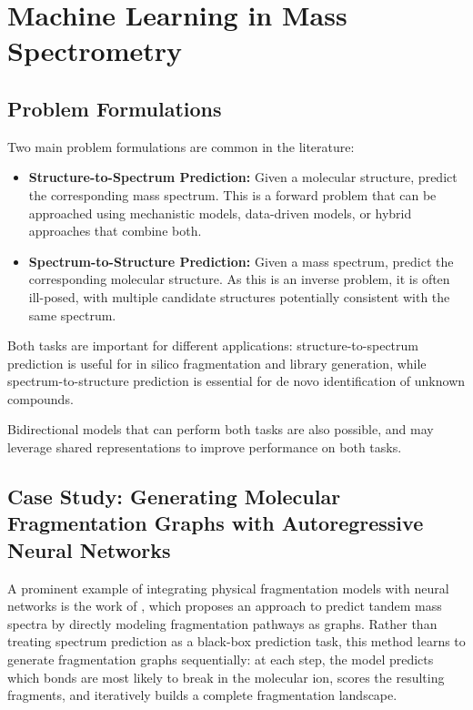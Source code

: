 \section{Machine Learning in Mass Spectrometry}
\subsection{Problem Formulations}
Two main problem formulations are common in the literature:
\begin{itemize}
    \item \textbf{Structure-to-Spectrum Prediction:}
    Given a molecular structure, predict the corresponding mass spectrum.
    This is a forward problem that can be approached using mechanistic models, data-driven models, or hybrid approaches that combine both.
    \item \textbf{Spectrum-to-Structure Prediction:} 
    Given a mass spectrum, predict the corresponding molecular structure. 
    As this is an inverse problem, it is often ill-posed, with multiple candidate structures potentially consistent with the same spectrum.
\end{itemize}
Both tasks are important for different applications: structure-to-spectrum prediction is useful for in silico fragmentation and library generation, while spectrum-to-structure prediction is essential for de novo identification of unknown compounds.

Bidirectional models that can perform both tasks are also possible, and may leverage shared representations to improve performance on both tasks.

\subsection{Case Study: Generating Molecular Fragmentation Graphs with Autoregressive Neural Networks}

A prominent example of integrating physical fragmentation models with neural networks is the work of \cite{Goldman2024}, which proposes an approach to predict tandem mass spectra by directly modeling fragmentation pathways as graphs. 
Rather than treating spectrum prediction as a black-box prediction task, this method learns to generate fragmentation graphs sequentially: at each step, the model predicts which bonds are most likely to break in the molecular ion, scores the resulting fragments, and iteratively builds a complete fragmentation landscape.

